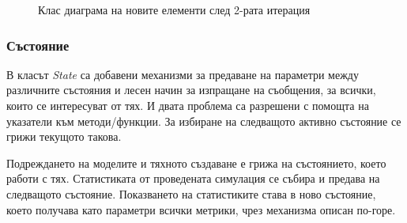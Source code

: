 		\begin{figure}
			\caption{Клас диаграма на новите елементи след 2-рата итерация}
			\label{figure:simulation-class-diagram-two}
				\begin{center}
				\end{center}
		\end{figure}
		
		\subsubsection{Състояние}
			
		В класът \emph{State} са добавени механизми за предаване на параметри между различните състояния и лесен начин за изпращане
		на съобщения, за всички, които се интересуват от тях. И двата проблема са разрешени с помощта на указатели към методи/функции.
		За избиране на следващото активно състояние се грижи текущото такова.

		Подреждането на моделите и тяхното създаване е грижа на състоянието, което работи с тях. 
		Статистиката от проведената симулация се събира и предава на следващото състояние.
		Показването на статистиките става в ново състояние, което получава като параметри всички метрики, чрез механизма описан по-горе.
		

